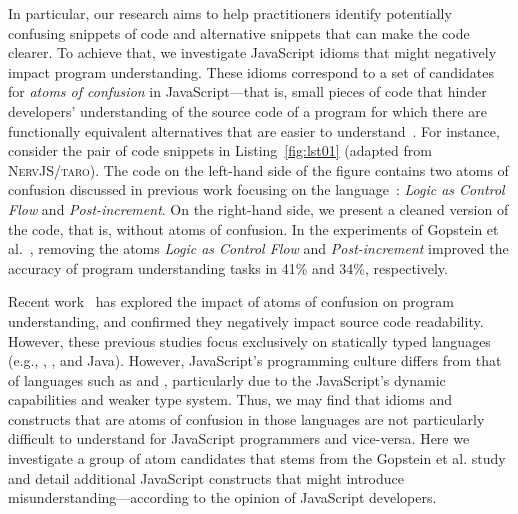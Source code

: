In particular, our research aims to help practitioners identify potentially confusing snippets of code and alternative snippets that can make the code clearer.
To achieve that, we investigate JavaScript idioms that
might negatively impact program understanding. These idioms correspond to a set of candidates for \emph{atoms of confusion} in
JavaScript---that is, small
pieces of code that hinder developers' understanding of the source code of a program
for which there are functionally equivalent alternatives that are easier
to understand~\cite{DBLP:conf/sigsoft/GopsteinIYDZYC17}. For instance, consider
the pair of code snippets in Listing~\ref{fig:lst01} (adapted from \textsc{NervJS/taro}).
The code on the left-hand side of the figure contains two atoms of confusion discussed in previous work focusing on the \clang
language~\cite{DBLP:conf/sigsoft/GopsteinIYDZYC17}: \emph{Logic as Control Flow} and \emph{Post-increment}. On the right-hand side, we present a cleaned version of the code, that is, without atoms of confusion. In the experiments of Gopstein et al.~\cite{DBLP:conf/sigsoft/GopsteinIYDZYC17}, removing the atoms \emph{Logic as Control Flow} and \emph{Post-increment} improved the accuracy of program understanding tasks in  41\% and 34\%, respectively.

Recent work~\cite{DBLP:journals/ese/MedeirosLAAKRG19,DBLP:conf/sigsoft/GopsteinIYDZYC17,Langhout:2021:ACJ} has explored the impact of atoms of confusion on program understanding, and confirmed they negatively impact source code readability.
However, these previous studies focus exclusively on statically typed languages (e.g., \clang, \cpplang, and Java). However, JavaScript's programming culture differs from that of languages such as \clang and \cpplang, particularly due to the JavaScript's dynamic
capabilities and weaker type system. Thus, we may find that idioms and constructs that are atoms of confusion in those languages are not particularly difficult to understand for JavaScript programmers and vice-versa. Here we investigate a group of atom candidates
that stems from the Gopstein et al. study and detail additional JavaScript constructs
that might introduce misunderstanding---according to the opinion of JavaScript
developers. 

